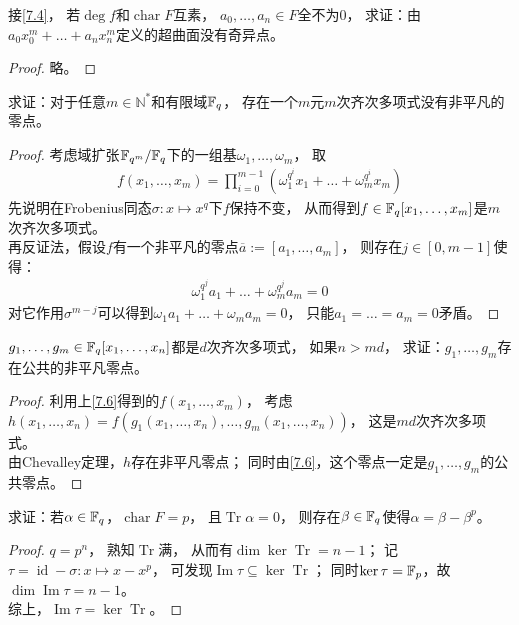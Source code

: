 \begin{exercise}\label{7.5}
    接\ref{7.4}，
    若$\deg f$和$\operatorname{char}F$互素，
    $a_0,\ldots,a_n\in F$全不为$0$，
    求证：由$a_0x_0^m+\ldots+a_nx_n^m$定义的超曲面没有奇异点。
\end{exercise}
\begin{proof}
    略。
\end{proof}

\begin{exercise}\label{7.6}
    求证：对于任意$m\in \mathbb{N}^*$和有限域$\mathbb{F}_q$，
    存在一个$m$元$m$次齐次多项式没有非平凡的零点。
\end{exercise}
\begin{proof}
    考虑域扩张$\mathbb{F}_{q^m}/\mathbb{F}_q$下的一组基${\omega_1,\ldots,\omega_m}$，
    取\begin{align*}
        f(x_1,\ldots,x_m)=\prod_{i=0}^{m-1}(\omega_1^{q^i}x_1+\ldots+\omega_m^{q^i}x_m)
    \end{align*}
    先说明在Frobenius同态$\sigma:x\mapsto x^q$下$f$保持不变，
    从而得到$f\in\mathbb{F}_q[x_1,\ldots,x_m]$是$m$次齐次多项式。\\
    再反证法，假设$f$有一个非平凡的零点$\overline{a}:=[a_1,\ldots,a_m]$，
    则存在$j\in[0,m-1]$使得：
    \begin{align*}
         \omega_1^{q^j}a_1+\ldots+\omega_m^{q^j}a_m=0
    \end{align*}
    对它作用$\sigma^{m-j}$可以得到$\omega_1a_1+\ldots+\omega_ma_m=0$，
    只能$a_1=\ldots=a_m=0$矛盾。
\end{proof}

\begin{exercise}\label{7.7}
    $g_1,\ldots,g_m\in\mathbb{F}_q[x_1,\ldots,x_n]$都是$d$次齐次多项式，
    如果$n>md$，
    求证：$g_1,\ldots,g_m$存在公共的非平凡零点。
\end{exercise}
\begin{proof}
    利用上\ref{7.6}得到的$f(x_1,\ldots,x_m)$，
    考虑$h(x_1,\ldots,x_n)=f(g_1(x_1,\ldots,x_n),\ldots,g_m(x_1,\ldots,x_n))$，
    这是$md$次齐次多项式。\\
    由Chevalley定理，$h$存在非平凡零点；
    同时由\ref{7.6}，这个零点一定是$g_1,\ldots,g_m$的公共零点。
\end{proof}

\begin{exercise}\label{7.8}
    求证：若$\alpha\in\mathbb{F}_q$，$\operatorname{char}F=p$，
    且$\operatorname{Tr}\alpha=0$，
    则存在$\beta\in\mathbb{F}_q$使得$\alpha=\beta-\beta^p$。
\end{exercise}
\begin{proof}
    $q=p^n$，
    熟知$\operatorname{Tr}$满，
    从而有$\dim\ker\operatorname{Tr}=n-1$；
    记$\tau=\operatorname{id}-\sigma:x\mapsto x-x^p$，
    可发现$\operatorname{Im}\tau\subseteq\ker\operatorname{Tr}$；
    同时$\ker\tau=\mathbb{F}_p$，故$\dim\operatorname{Im}\tau=n-1$。\\
    综上，$\operatorname{Im}\tau=\ker\operatorname{Tr}$。
\end{proof}

